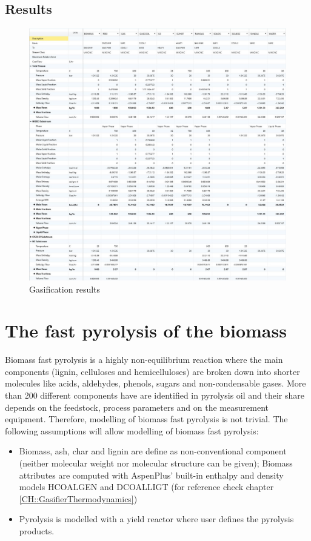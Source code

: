 \newpage \subsection{Results}
\begin{figure}[h!]
	\centering
	\includegraphics[width=\linewidth]{Figures/TchermochemicalProcesses/GasificationResults.jpg}
	\caption{Gasification results}
\end{figure}

\newpage
\section{The fast pyrolysis of the biomass}

Biomass fast pyrolysis is a highly non-equilibrium reaction where the main components (lignin, celluloses and hemicelluloses) are broken down into shorter molecules like acids, aldehydes, phenols, sugars and non-condensable gases. More than 200 different components have are identified
in pyrolysis oil and their share depends on the feedstock, process parameters and on the measurement equipment. Therefore, modelling of biomass fast pyrolysis is not trivial. The following assumptions will allow modelling of biomass fast pyrolysis:

\begin{itemize}
	\item Biomass, ash, char and lignin are define as non-conventional component (neither molecular weight nor molecular structure can be given); Biomass attributes are computed with AspenPlus’ built-in enthalpy and density models HCOALGEN and DCOALLIGT (for reference check chapter \ref{CH::GasifierThermodynamics})
	\item Pyrolysis is modelled with a yield reactor where user defines the pyrolysis products.
\end{itemize}

